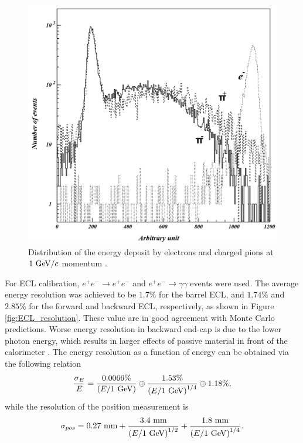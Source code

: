 \begin{figure}[H]
	\centering
	\captionsetup{width=0.8\linewidth}
	\includegraphics[width=0.6\linewidth]{fig/setup/ECL_deposit}
	\caption{Distribution of the energy deposit by electrons and charged pions at $1\mathrm{~GeV}/c$ momentum \cite{ABASHIAN2002117}.}
	\label{fig:ECL_deposit}
\end{figure}

For ECL calibration, $e^+e^- \to e^+e^-$ and $e^+e^- \to \gamma\gamma$ events were used. The average energy resolution was achieved to be $1.7\%$ for the barrel ECL, and $1.74\%$ and $2.85\%$ for the forward and backward ECL, respectively, as shown in Figure \ref{fig:ECL_resolution}. These value are in good agreement with Monte Carlo predictions. Worse energy resolution in backward end-cap is due to the lower photon energy, which results in larger effects of passive material in front of the calorimeter \cite{haba2004letter}. The energy resolution as a function of energy can be obtained via the following relation
\begin{equation}
\frac{\sigma_E}{E} = \frac{0.0066\%}{\left(E/1\mathrm{~GeV}\right)}\oplus\frac{1.53\%}{\left( E/1\mathrm{~GeV}\right)^{1/4}}\oplus 1.18\%,
\end{equation}
while the resolution of the position measurement is
\begin{equation}
\sigma_{pos} = 0.27\mathrm{~mm}+\frac{3.4\mathrm{~mm}}{\left( E/1\mathrm{~GeV}\right)^{1/2}} + \frac{1.8\mathrm{~mm}}{\left( E/1\mathrm{~GeV}\right)^{1/4}}.
\end{equation}

